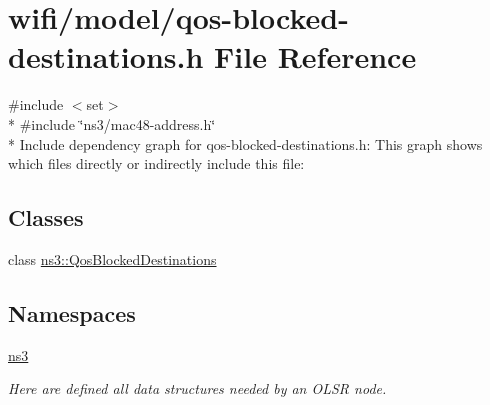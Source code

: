\hypertarget{qos-blocked-destinations_8h}{}\section{wifi/model/qos-\/blocked-\/destinations.h File Reference}
\label{qos-blocked-destinations_8h}
{\ttfamily \#include $<$set$>$}\\*
{\ttfamily \#include \char`\"{}ns3/mac48-\/address.\+h\char`\"{}}\\*
Include dependency graph for qos-\/blocked-\/destinations.h\+:
This graph shows which files directly or indirectly include this file\+:
\subsection*{Classes}
\begin{DoxyCompactItemize}
\item 
class \hyperlink{classns3_1_1QosBlockedDestinations}{ns3\+::\+Qos\+Blocked\+Destinations}
\end{DoxyCompactItemize}
\subsection*{Namespaces}
\begin{DoxyCompactItemize}
\item 
 \hyperlink{namespacens3}{ns3}
\begin{DoxyCompactList}\small\item\em Here are defined all data structures needed by an O\+L\+SR node. \end{DoxyCompactList}\end{DoxyCompactItemize}
